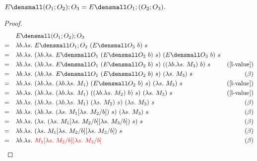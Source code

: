 \begin{theorem}
    $ E\den{(O_1;O_2);O_3} = E\den{O_1;(O_2;O_3)}.$
    \begin{proof}
        \begin{align*}
            &\quad E\den{(O_1;O_2);O_3} \\
            =& \quad \lambda b. \lambda s.~ E\den{O_1;O_2} ~(E\den{O_3} ~b) ~s \\
            =& \quad \lambda b. \lambda s.~ (\lambda b. \lambda s.~ E\den{O_1} ~(E\den{O_2} ~b) ~s) ~(E\den{O_3} ~b) ~s \\
            =& \quad \lambda b. \lambda s.~ (\lambda b. \lambda s.~ E\den{O_1} ~(E\den{O_2} ~b) ~s) ~((\lambda b. \lambda s.~ M_3) ~b) ~s & (\cref{l-value})\\
            =& \quad \lambda b. \lambda s.~ (\lambda b. \lambda s.~ E\den{O_1} ~(E\den{O_2} ~b) ~s) ~(\lambda s.~ M_3) ~s & (\beta)\\
            =& \quad \lambda b. \lambda s.~ (\lambda b. \lambda s.~ (\lambda b. \lambda s.~ M_1) ~(E\den{O_2} ~b) ~s) ~(\lambda s.~ M_3) ~s & (\cref{l-value})\\
            =& \quad \lambda b. \lambda s.~ (\lambda b. \lambda s.~ (\lambda b. \lambda s.~ M_1) ~((\lambda b. \lambda s.~ M_2) ~b) ~s) ~(\lambda s.~ M_3) ~s & (\cref{l-value})\\
            =& \quad \lambda b. \lambda s.~ (\lambda b. \lambda s.~ (\lambda b. \lambda s.~ M_1) ~(\lambda s.~ M_2) ~s) ~(\lambda s.~ M_3) ~s & (\beta) \\
            =& \quad \lambda b. \lambda s.~ (\lambda b. \lambda s.~ (\lambda s.~ M_1\subst{b}{\lambda s.~ M_2}) ~s) ~(\lambda s.~ M_3) ~s & (\beta) \\
            =& \quad \lambda b. \lambda s.~ (\lambda s.~ (\lambda s.~ M_1\subst{b}{\lambda s.~ M_2}\subst{b}{\lambda s.~ M_3}) ~s) ~s & (\beta) \\
            =& \quad \lambda b. \lambda s.~ (\lambda s.~ M_1\subst{b}{\lambda s.~ M_2}\subst{b}{\lambda s.~ M_3}) ~s & (\beta) \\
            =& \quad \lambda b. \lambda s.~ \color{red}{M_1\subst{b}{\lambda s.~ M_2}\subst{b}{\lambda s.~ M_3}} & (\beta)
        \end{align*}


\end{proof}
\end{theorem}
